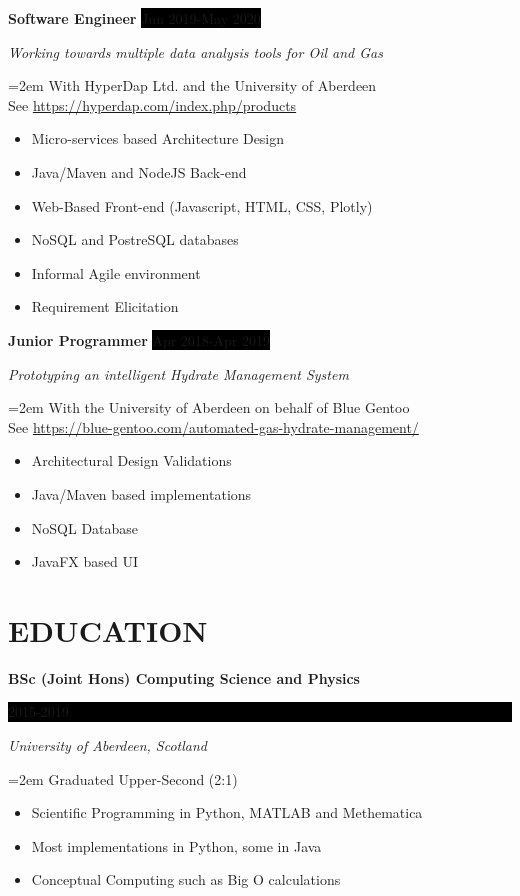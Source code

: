 \documentclass[paper=a4,fontsize=11pt]{scrartcl} %
\newcommand{\sepspace}{\vspace*{1em}}    %
\newcommand{\NewPart}[1]{\section*{\uppercase{{#1}}}}
\newcommand{\EducationEntry}[4]{
  \noindent \textbf{#1} \hfill      %
    \colorbox{Black}{%
      \parbox{6em}{%
      \hfill\color{White}#2}} \par  %
      \noindent \textit{#3} \par        %
      \noindent\hangindent=2em\hangafter=0 \small #4 %
    \normalsize \par}
\newcommand{\WorkEntry}[4]{          %
  \noindent \textbf{#1} \hfill      %
  \colorbox{Black}{\color{White}#2} \par  %
  \noindent \textit{#3} \par              %
  \noindent\hangindent=2em\hangafter=0 \small #4 %
  \normalsize \par}
\begin{document}
\sepspace

\WorkEntry{Software Engineer}{Jun 2019-May 2020}{Working towards multiple data
analysis tools for Oil and Gas}{With HyperDap Ltd. and the University of
Aberdeen \\
\hspace{5pt} \footnotesize See
\textcolor{headerColor}{\url{https://hyperdap.com/index.php/products}}
\vspace{5pt}
\begin{itemize}[noitemsep,topsep=0pt]
  \item Micro-services based Architecture Design
  \item Java/Maven and NodeJS Back-end
  \item Web-Based Front-end (Javascript, HTML, CSS, Plotly)
  \item NoSQL and PostreSQL databases
  \item Informal Agile environment
  \item Requirement Elicitation
\end{itemize}
}

\sepspace

\WorkEntry{Junior Programmer}{Apr 2018-Apr 2019}{Prototyping an intelligent
Hydrate Management System}{With the University of Aberdeen on behalf of Blue
Gentoo \\
\hspace{5pt} \footnotesize See
\textcolor{headerColor}{\url{https://blue-gentoo.com/automated-gas-hydrate-management/}}
\vspace{5pt}
\begin{itemize}[noitemsep,topsep=0pt]
  \item Architectural Design Validations
  \item Java/Maven based implementations
  \item NoSQL Database
  \item JavaFX based UI
\end{itemize}
}


\cleardoublepage

  \StylisedName
  \SameAddress

\NewPart{Education}{}

\EducationEntry{BSc (Joint Hons) Computing Science and
Physics}{2015-2019}{University of Aberdeen, Scotland}{
Graduated Upper-Second (2:1)
\vspace{5pt}
\begin{itemize}[noitemsep,topsep=0pt]
  \item Scientific Programming in Python, MATLAB and Methematica
  \item Most implementations in Python, some in Java
  \item Conceptual Computing such as Big O calculations
\end{itemize}
}
\end{document}
